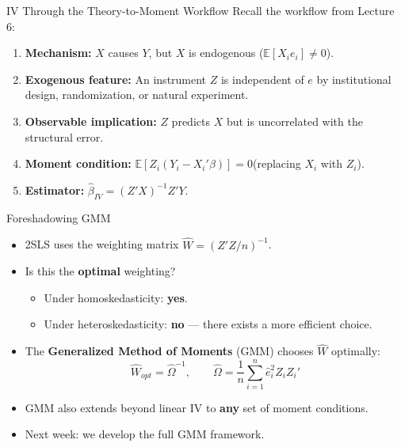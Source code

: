 \documentclass[aspectratio=169, handout]{beamer}
\numberwithin{equation}{section}
\begin{document}
\begin{frame}{IV Through the Theory-to-Moment Workflow}
Recall the workflow from Lecture 6:

\medskip
\begin{enumerate}
\item \textbf{Mechanism:} $X$ causes $Y$, but $X$ is endogenous ($\mathbb{E}[X_i e_i]\neq 0$).
\item \textbf{Exogenous feature:} An instrument $Z$ is independent of $e$ by institutional design, randomization, or natural experiment.
\item \textbf{Observable implication:} $Z$ predicts $X$ but is uncorrelated with the structural error.
\item \textbf{Moment condition:} $\mathbb{E}[Z_i(Y_i - X_i'\beta)]=0$\quad (replacing $X_i$ with $Z_i$).
\item \textbf{Estimator:} $\hat{\beta}_{IV}=(Z'X)^{-1}Z'Y$.
\end{enumerate}
\end{frame}


\begin{frame}{Foreshadowing GMM}
\begin{itemize}
\item 2SLS uses the weighting matrix $\hat{W}=(Z'Z/n)^{-1}$.
\item Is this the \textbf{optimal} weighting?
\begin{itemize}
\item Under homoskedasticity: \textbf{yes}.
\item Under heteroskedasticity: \textbf{no} --- there exists a more efficient choice.
\end{itemize}
\item The \textbf{Generalized Method of Moments} (GMM) chooses $\hat{W}$ optimally:
$$\hat{W}_{opt} = \hat{\Omega}^{-1}, \qquad \hat{\Omega} = \frac{1}{n}\sum_{i=1}^n \hat{e}_i^2 Z_iZ_i'$$
\item GMM also extends beyond linear IV to \textbf{any} set of moment conditions.
\item \alert{Next week:} we develop the full GMM framework.
\end{itemize}
\end{frame}
\end{document}
